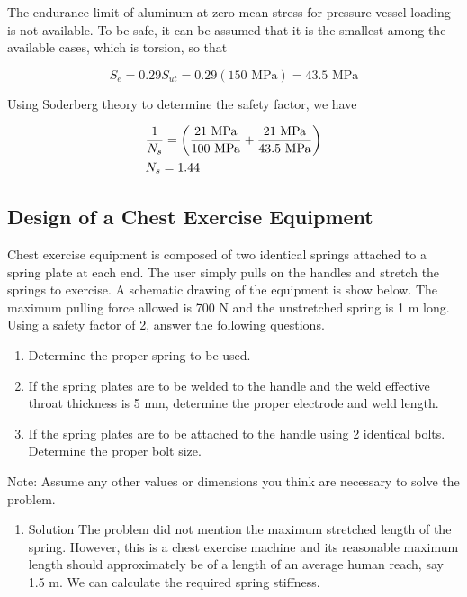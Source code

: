 \documentclass[a4paper,openany,nobib]{tufte-book}
\begin{document}
{{\begin{enumerate}
\begin{enumerate}
The endurance limit of aluminum at zero mean stress for pressure
vessel loading is not available. To be safe, it can be assumed that
it is the smallest among the available cases, which is torsion, so
that

$$S_e = 0.29S _{ut} = 0.29(150\text{ MPa}) = 43.5\text{ MPa}$$

Using Soderberg theory to determine the safety factor, we have

$$\begin{gathered}
         \frac{1}{N_s} = \left( \frac{21\text{ MPa}}{100\text{ MPa}} + \frac{21\text{ MPa}}{43.5\text{ MPa}} \right) \hfill \\
         N_s = 1.44 \hfill \\ 
       \end{gathered}$$
\end{enumerate}
\end{enumerate}

\subsection{Design of a Chest Exercise Equipment}
\label{design-of-a-chest-exercise-equipment}
Chest exercise equipment is composed of two identical springs attached
to a spring plate at each end. The user simply pulls on the handles and
stretch the springs to exercise. A schematic drawing of the equipment is
show below. The maximum pulling force allowed is 700 N and the
unstretched spring is 1 m long. Using a safety factor of 2, answer the
following questions.



\begin{enumerate}
\item Determine the proper spring to be used.

\item If the spring plates are to be welded to the handle and the weld
effective throat thickness is 5 mm, determine the proper electrode
and weld length.

\item If the spring plates are to be attached to the handle using 2
identical bolts. Determine the proper bolt size.
\end{enumerate}

Note: Assume any other values or dimensions you think are necessary to
solve the problem.

\begin{enumerate}
\item Solution
\label{solution-2}
The problem did not mention the maximum stretched length of the spring.
However, this is a chest exercise machine and its reasonable maximum
length should approximately be of a length of an average human reach,
say 1.5 m. We can calculate the required spring stiffness.


\end{enumerate}}}
\end{document}
